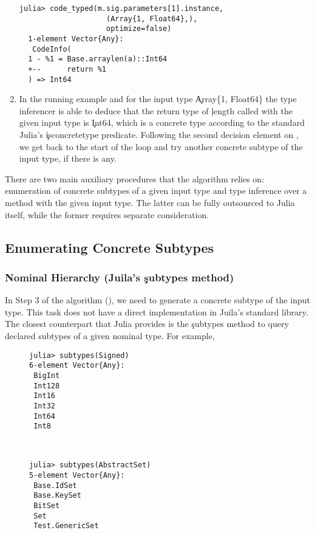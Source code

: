\begin{enumerate}
\begin{minipage}{.92\textwidth}
\begin{lstlisting}[style=jterm]
  julia> code_typed(m.sig.parameters[1].instance,
                    (Array{1, Float64},),
                    optimize=false)
  1-element Vector{Any}:
   CodeInfo(
  1 - %1 = Base.arraylen(a)::Int64
  +--      return %1
  ) => Int64
\end{lstlisting}
\end{minipage}

  \item In the running example and for the input type \c{Array\{1, Float64\}}
  the type inferencer is able to deduce that the return type of \c{length}
  called with the given input type is \c{Int64}, which is a concrete type
  according to the standard Julia's \c{isconcretetype} predicate.
  Following the second decision element on , we get back to
  the start of the loop and try another concrete subtype of the input type,
  if there is any.
\end{enumerate}

There are two main auxiliary procedures that the algorithm relies on: enumeration of
concrete subtypes of a given input type and type inference over a method with the
given input type. The latter can be fully outsourced to Julia itself, while the
former requires separate consideration.

\subsection{Enumerating Concrete Subtypes}%
\label{sec:approx:enu}

\subsubsection{Nominal Hierarchy (Juila's \c{subtypes} method)}

In Step 3 of the algorithm (), we need to generate a
concrete subtype of the input type. This task does not have a direct
implementation in Juila's standard library. The closest counterpart that Julia
provides is the \c{subtypes} method to query declared subtypes of a given
nominal type. For example,
\begin{figure}[h]
\begin{minipage}{.49\textwidth}
\begin{lstlisting}[style=jterm]
julia> subtypes(Signed)
6-element Vector{Any}:
 BigInt
 Int128
 Int16
 Int32
 Int64
 Int8
\end{lstlisting}
\end{minipage}
~
\begin{minipage}{.49\textwidth}
\begin{lstlisting}[style=jterm]
julia> subtypes(AbstractSet)
5-element Vector{Any}:
 Base.IdSet
 Base.KeySet
 BitSet
 Set
 Test.GenericSet

\end{lstlisting}
\end{minipage}
\end{figure}

